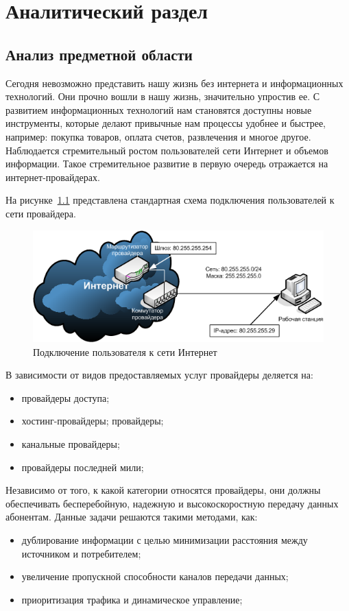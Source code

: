 \chapter{Аналитический раздел}
\label{cha:analysis}
\section{Анализ предметной области}
Сегодня невозможно представить нашу жизнь без интернета и информационных технологий. Они прочно вошли в нашу жизнь, значительно упростив ее. С развитием информационных технологий нам становятся доступны новые инструменты, которые делают привычные нам процессы удобнее и быстрее, например: покупка товаров, оплата счетов, развлечения и многое другое. Наблюдается стремительный ростом пользователей сети Интернет и объемов информации. Такое стремительное развитие в первую очередь отражается на интернет-провайдерах.

На рисунке~\ref{pic:user_connection_schema} представлена стандартная схема подключения пользователей к сети провайдера.
\begin{figure}
\centering
\includegraphics[scale=0.7]{pictures/user_connection_schema}
\caption{Подключение пользователя к сети Интернет}
\label{pic:user_connection_schema}
\end{figure}

В зависимости от видов предоставляемых услуг провайдеры деляется на:
\begin{itemize}
\item провайдеры доступа;
\item хостинг-провайдеры;
 провайдеры;
\item канальные провайдеры;
\item провайдеры последней мили;
\end{itemize}

Независимо от того, к какой категории относятся провайдеры, они должны обеспечивать бесперебойную, надежную и высокоскоростную передачу данных абонентам. Данные задачи решаются такими методами, как:
\begin{itemize}
\item дублирование информации с целью минимизации расстояния между источником и потребителем;
\item увеличение пропускной способности каналов передачи данных;
\item приоритизация трафика и динамическое управление;
\end{itemize}


